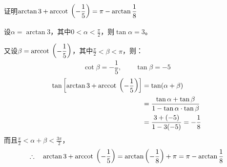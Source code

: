 \begin{example}
    证明$\arctan 3+{\rm arccot\; }\left(-\dfrac{1}{5}\right)=\pi-\arctan\dfrac{1}{8}$
\end{example}

\begin{solution}
设$\alpha=\arctan 3$，其中$0<\alpha<\frac{\pi}{2}$，则$\tan\alpha=3$。

又设$\beta={\rm arccot\; }\left(-\dfrac{1}{5}\right)$，其中$\frac{\pi}{2}<\beta<\pi$，则：
\[\cot\beta=-\frac{1}{5},\qquad \tan\beta=-5\]
\[\begin{split}
 \tan\left[\arctan 3+{\rm arccot\; }\left(-\dfrac{1}{5}\right)\right]
&=\tan(\alpha+\beta)\\
&=\dfrac{\tan\alpha+\tan\beta}{1-\tan\alpha\cdot \tan\beta}\\
&=\dfrac{3+(-5)}{1-3(-5)}=-\dfrac{1}{8}
\end{split}\]
而且$\frac{\pi}{2}<\alpha+\beta<\frac{3\pi}{2}$，
\[\therefore\quad \arctan 3+{\rm arccot\; }\left(-\dfrac{1}{5}\right)=\arctan\left(-\dfrac{1}{8}\right)+\pi=\pi-\arctan\dfrac{1}{8}\]
\end{solution}

